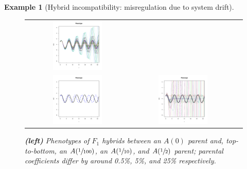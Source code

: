 \documentclass{article}
\newcommand{\1}{\mathbbm{1}}
\newtheorem{example}{Example}
\begin{document}
\begin{example}[Hybrid incompatibility: misregulation due to system drift]
\begin{figure}[H]
\begin{tabular}{ccc}
      \includegraphics[width=0.5\textwidth, height=0.125\paperheight]{examples/osc_F2_tenthtau0.pdf} \\
      \includegraphics[width=0.5\textwidth, height=0.125\paperheight]{examples/osc_F1_half_tau0.pdf} &
      \includegraphics[width=0.5\textwidth, height=0.125\paperheight]{examples/osc_F2_halftau0.pdf}
  \end{tabular}
  \caption{
    \textbf{(left)} Phenotypes of $F_1$ hybrids between an $A(0)$ parent and, top-to-bottom, an $A(\sfrac{1}{100})$, an $A(\sfrac{1}{10})$, and $A(\sfrac{1}{2})$ parent;
    parental coefficients differ by around 0.5\%, 5\%, and 25\% respectively.
}
\end{figure}
\end{example}
\end{document}
